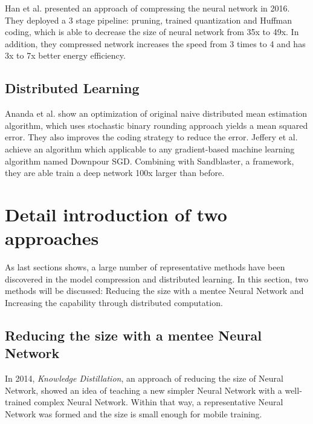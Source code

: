 \documentclass[article]{aaltoseries}
\begin{document}
Han et al.\cite{Han2015} presented an approach of compressing the neural network in 2016. 
They deployed a 3 stage pipeline: pruning, trained quantization and Huffman coding, which is able to decrease
the size of neural network from 35x to 49x. In addition, they compressed network increases the speed from 3 times to 4
and has 3x to 7x better energy efficiency.

\subsection{Distributed Learning}

Ananda et al.\cite{Suresh2016} show an optimization of original naive distributed mean estimation algorithm, which uses 
stochastic binary rounding approach yields a mean squared error. They also improves the coding strategy to reduce the error.
Jeffery et al.\cite{NIPS2012_4687} achieve an algorithm which applicable to any gradient-based 
machine learning algorithm named Downpour SGD.
Combining with Sandblaster, a framework, they are able train a deep network 100x larger than before.







\section{Detail introduction of two approaches}
\label{sec:approaches}





As last sections shows, a large number of representative methods have been discovered in the model compression and distributed learning. 
In this section, two methods will be discussed:
Reducing the size with a mentee Neural Network and Increasing the capability through distributed computation.


\subsection{Reducing the size with a mentee Neural Network}

In 2014, \emph{Knowledge Distillation}, an approach of reducing the size of Neural Network, 
showed an idea of teaching a new simpler Neural Network with a well-trained complex Neural Network.
Within that way, a representative Neural Network was formed and the size is small enough for mobile training.
\end{document}

